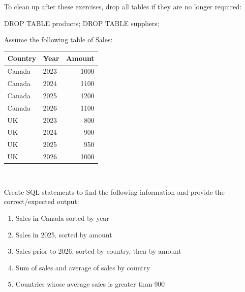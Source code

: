 \noindent To clean up after these exercises, drop all tables if they are no longer required:

\begin{sqlcode}
DROP TABLE products;
DROP TABLE suppliers;
\end{sqlcode}

\begin{exerciseboxpaper}
Assume the following table of Sales: \\

\renewcommand{\arraystretch}{1.25}
  \begin{tabular}{l|l|r} 
    {\bf Country} & {\bf Year} & {\bf Amount} \\ \hline
    Canada & 2023 & 1000 \\ 
    Canada & 2024 & 1100 \\
    Canada & 2025 & 1200 \\ 
    Canada & 2026 & 1100 \\
    UK & 2023 & 800 \\
    UK & 2024 & 900 \\
    UK & 2025 & 950 \\ 
    UK & 2026 & 1000 \\ \hline
  \end{tabular} \\
\vspace{.5\baselineskip}

Create SQL statements to find the following information and provide the correct/expected output:
  \begin{enumerate}
    \item Sales in Canada sorted by year
    \item Sales in 2025, sorted by amount
    \item Sales prior to 2026, sorted by country, then by amount
    \item Sum of sales and average of sales by country
    \item Countries whose average sales is greater than 900
  \end{enumerate}
\end{exerciseboxpaper}

